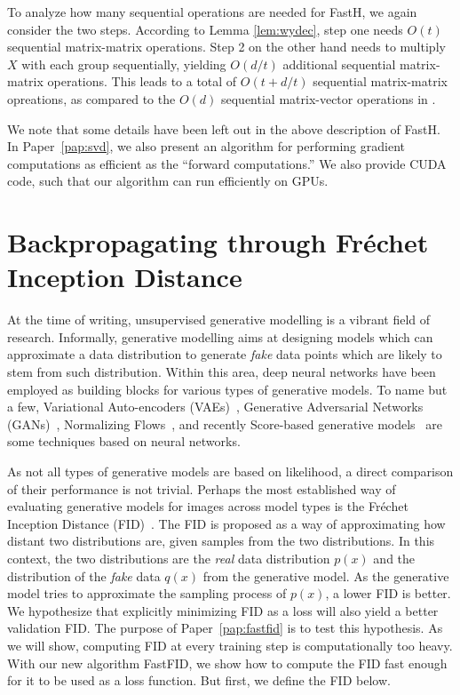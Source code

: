 \documentclass[11pt,a4paper,twoside,openright,final]{memoir}
\newcommand\contribution[1]{\hspace{0.5em}\hyperref[#1]{\ding{81}}}
\newcommand*{\paperref}[1]{Paper~\hyperref[#1]{\ref{#1}}}
\begin{document}
To analyze how many sequential operations are needed for FastH, we again consider the two steps.
According to Lemma \ref{lem:wydec}, step one needs $O(t)$ sequential matrix-matrix operations.
Step 2 on the other hand needs to multiply $X$ with each group sequentially, yielding $O(d/t)$ additional sequential matrix-matrix operations.
This leads to a total of $O(t + d/t)$ sequential matrix-matrix opreations, as compared to the $O(d)$ sequential matrix-vector operations in \cite{sequential}. 

We note that some details have been left out in the above description of FastH. 
In \paperref{pap:svd}, we also present an algorithm for performing gradient computations as efficient as the ``forward computations.''
We also provide CUDA code, such that our algorithm can run efficiently on GPUs.

\section{Backpropagating through Fr\'echet Inception Distance\contribution{pap:fastfid}} \label{sec:fid}
At the time of writing, unsupervised generative modelling is a vibrant field of research.
Informally, generative modelling aims at designing models which can approximate a data distribution to generate \emph{fake} data points which are likely to stem from such distribution.
Within this area, deep neural networks have been employed as building blocks for various types of generative models.
To name but a few, Variational Auto-encoders (VAEs)~\cite{vae}, Generative Adversarial Networks (GANs)~\cite{gans}, Normalizing Flows~\cite{nice}, and recently Score-based generative models~\cite{sgm-stochastic-differential-equations} are some techniques based on neural networks.

As not all types of generative models are based on likelihood, a direct comparison of their performance is not trivial.
Perhaps the most established way of evaluating generative models for images across model types is the Fr\'echet Inception Distance (FID)~\cite{fid, fid-comparison}. 
The FID is proposed as a way of approximating how distant two distributions are, given samples from the two distributions. 
In this context, the two distributions are the \emph{real} data distribution $p(x)$ and the distribution of the \emph{fake} data $q(x)$ from the generative model.
As the generative model tries to approximate the sampling process of $p(x)$, a lower FID is better.
We hypothesize that explicitly minimizing FID as a loss will also yield a better validation FID.
The purpose of \paperref{pap:fastfid} is to test this hypothesis.
As we will show, computing FID at every training step is computationally too heavy.
With our new algorithm FastFID, we show how to compute the FID fast enough for it to be used as a loss function. 
But first, we define the FID below.
\end{document}
